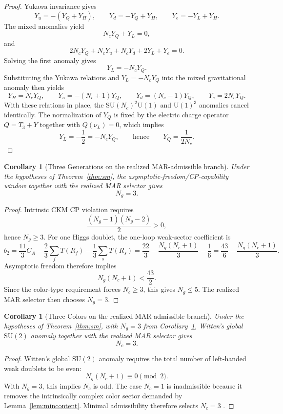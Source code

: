\documentclass[11pt]{article}
\newtheorem{corollary}[theorem]{Corollary}
\newcommand{\SU}{\mathrm{SU}}
\newcommand{\U}{\mathrm{U}}
\begin{document}
\begin{proof}
Yukawa invariance gives
\[
Y_u=-(Y_Q+Y_H),\qquad
Y_d=-Y_Q+Y_H,\qquad
Y_e=-Y_L+Y_H.
\]
The mixed anomalies yield
\[
N_cY_Q+Y_L=0,
\]
and
\[
2N_cY_Q+N_cY_u+N_cY_d+2Y_L+Y_e=0.
\]
Solving the first anomaly gives
\[
Y_L=-N_cY_Q.
\]
Substituting the Yukawa relations and $Y_L=-N_cY_Q$ into the mixed gravitational anomaly then yields
\[
Y_H=N_cY_Q,\qquad
Y_u=-(N_c+1)Y_Q,\qquad
Y_d=(N_c-1)Y_Q,\qquad
Y_e=2N_cY_Q.
\]
With these relations in place, the $\SU(N_c)^2\U(1)$ and $\U(1)^3$ anomalies cancel identically. The normalization of $Y_Q$ is fixed by the electric charge operator $Q=T_3+Y$ together with $Q(\nu_L)=0$, which implies
\[
Y_L=-\frac12=-N_cY_Q,
\qquad\text{hence}\qquad
Y_Q=\frac{1}{2N_c}.
\]
\end{proof}

\begin{corollary}[Three Generations on the realized MAR-admissible branch]\label{cor:ng}
Under the hypotheses of Theorem~\ref{thm:sm}, the asymptotic-freedom/CP-capability window together with the realized MAR selector gives
\[
N_g=3.
\]
\end{corollary}

\begin{proof}
Intrinsic CKM CP violation requires
\[
\frac{(N_g-1)(N_g-2)}{2}>0,
\]
hence $N_g\ge 3$. For one Higgs doublet, the one-loop weak-sector coefficient is
\[
b_2=\frac{11}{3}C_A-\frac{2}{3}\sum_f T(R_f)-\frac{1}{3}\sum_s T(R_s)
=
\frac{22}{3}-\frac{N_g(N_c+1)}{3}-\frac16
=
\frac{43}{6}-\frac{N_g(N_c+1)}{3}.
\]
Asymptotic freedom therefore implies
\[
N_g(N_c+1)<\frac{43}{2}.
\]
Since the color-type requirement forces $N_c\ge 3$, this gives $N_g\le 5$. The realized MAR selector then chooses $N_g=3$.
\end{proof}

\begin{corollary}[Three Colors on the realized MAR-admissible branch]\label{cor:nc}
Under the hypotheses of Theorem~\ref{thm:sm}, with \(N_g=3\) from Corollary~\ref{cor:ng}, Witten's global \(\SU(2)\) anomaly together with the realized MAR selector gives
\[
N_c=3.
\]
\end{corollary}

\begin{proof}
Witten's global $\SU(2)$ anomaly requires the total number of left-handed weak doublets to be even:
\[
N_g(N_c+1)\equiv 0 \pmod 2.
\]
With $N_g=3$, this implies $N_c$ is odd. The case $N_c=1$ is inadmissible because it removes the intrinsically complex color sector demanded by Lemma~\ref{lem:mincontent}. Minimal admissibility therefore selects $N_c=3$ \cite{witten82}.
\end{proof}
\end{document}
